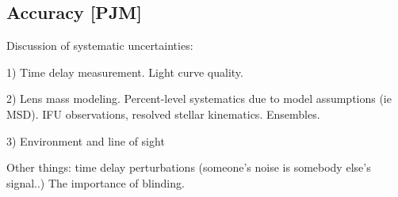 \subsection{Accuracy [PJM]}

Discussion of systematic uncertainties:

1) Time delay measurement. Light curve quality.

2) Lens mass modeling. Percent-level systematics due to model
assumptions (ie MSD). IFU observations, resolved stellar kinematics.
Ensembles.

3) Environment and line of sight

Other things: time delay perturbations (someone's noise is somebody else's signal..)
The importance of blinding.
